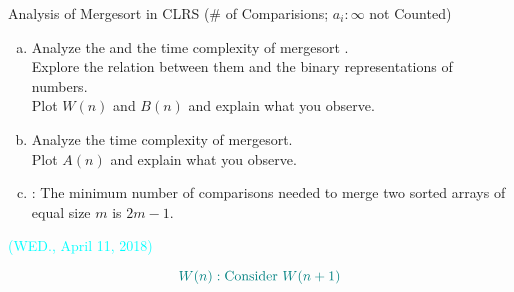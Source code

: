 
\begin{frame}{}

  \begin{columns}
  \end{columns}
\end{frame}

\begin{frame}{}
  \begin{exampleblock}{Analysis of Mergesort in CLRS (\# of Comparisions; $a_i : \infty$ not Counted)}
    \begin{enumerate}[(a)]
      \setlength{\itemsep}{5pt}
      \item Analyze the  and the  
	time complexity of mergesort . \\
	Explore the relation between them and the binary representations of numbers. \\
	Plot $W(n)$ and $B(n)$ and explain what you observe.
      \item Analyze the  time complexity of mergesort. \\
	Plot $A(n)$ and explain what you observe.
      \item {}: 
	The minimum number of comparisons needed to merge two sorted arrays of equal size $m$ is $2m - 1$.
    \end{enumerate}
  \end{exampleblock}

  \pause
  {\vspace{-0.30cm} \centerline{\textcolor{cyan}{\small (WED., April 11, 2018)}}}
  \[
    \textcolor{teal}{W(n): \text{Consider } W(n+1)}
  \]
\end{frame}

